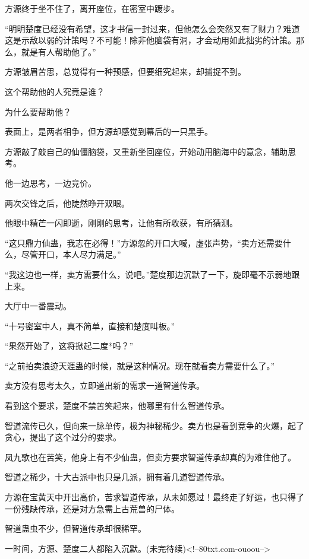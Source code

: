 \begin{this_body}
方源终于坐不住了，离开座位，在密室中踱步。

“明明楚度已经没有希望，这才书信一封过来，但他怎么会突然又有了财力？难道这是示敌以弱的计策吗？不可能！除非他脑袋有洞，才会动用如此拙劣的计策。那么，就是有人帮助他了。”

方源皱眉苦思，总觉得有一种预感，但要细究起来，却捕捉不到。

这个帮助他的人究竟是谁？

为什么要帮助他？

表面上，是两者相争，但方源却感觉到幕后的一只黑手。

方源敲了敲自己的仙僵脑袋，又重新坐回座位，开始动用脑海中的意念，辅助思考。

他一边思考，一边竞价。

两次交锋之后，他陡然睁开双眼。

他眼中精芒一闪即逝，刚刚的思考，让他有所收获，有所猜测。

“这只鼎力仙蛊，我志在必得！”方源忽的开口大喊，虚张声势，“卖方还需要什么，尽管开口，本人尽力满足。”

“我这边也一样，卖方需要什么，说吧。”楚度那边沉默了一下，旋即毫不示弱地跟上来。

大厅中一番震动。

“十号密室中人，真不简单，直接和楚度叫板。”

“果然开始了，这将掀起二度*吗？”

“之前拍卖浪迹天涯蛊的时候，就是这种情况。现在就看卖方需要什么了。”

卖方没有思考太久，立即道出新的需求一道智道传承。

看到这个要求，楚度不禁苦笑起来，他哪里有什么智道传承。

智道流传已久，但向来一脉单传，极为神秘稀少。卖方也是看到竞争的火爆，起了贪心，提出了这个过分的要求。

凤九歌也在苦笑，他身上有不少仙蛊，但卖方要求智道传承却真的为难住他了。

智道之稀少，十大古派中也只是几派，拥有着几道智道传承。

方源在宝黄天中开出高价，苦求智道传承，从未如愿过！最终走了好运，也只得了一份残缺传承，还是对方急需上古荒兽的尸体。

智道蛊虫不少，但智道传承却很稀罕。

一时间，方源、楚度二人都陷入沉默。(未完待续)<!--80txt.com-ouoou-->

\end{this_body}

